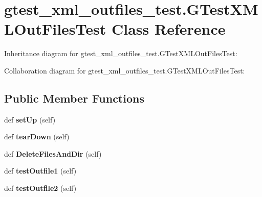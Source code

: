 \hypertarget{classgtest__xml__outfiles__test_1_1GTestXMLOutFilesTest}{}\section{gtest\+\_\+xml\+\_\+outfiles\+\_\+test.\+G\+Test\+X\+M\+L\+Out\+Files\+Test Class Reference}
\label{classgtest__xml__outfiles__test_1_1GTestXMLOutFilesTest}


Inheritance diagram for gtest\+\_\+xml\+\_\+outfiles\+\_\+test.\+G\+Test\+X\+M\+L\+Out\+Files\+Test\+:


Collaboration diagram for gtest\+\_\+xml\+\_\+outfiles\+\_\+test.\+G\+Test\+X\+M\+L\+Out\+Files\+Test\+:
\subsection*{Public Member Functions}
\begin{DoxyCompactItemize}
\item 
\mbox{\label{classgtest__xml__outfiles__test_1_1GTestXMLOutFilesTest_a56550f293277d18c36e868a637fe1153}} 
def {\bfseries set\+Up} (self)
\item 
\mbox{\label{classgtest__xml__outfiles__test_1_1GTestXMLOutFilesTest_a49d1d410370ba8a3cfcc281eaadb5706}} 
def {\bfseries tear\+Down} (self)
\item 
\mbox{\label{classgtest__xml__outfiles__test_1_1GTestXMLOutFilesTest_a503d2fbc9cd782ae57ac4307d2db43e1}} 
def {\bfseries Delete\+Files\+And\+Dir} (self)
\item 
\mbox{\label{classgtest__xml__outfiles__test_1_1GTestXMLOutFilesTest_a034738bbc00ac46d00f183402c561228}} 
def {\bfseries test\+Outfile1} (self)
\item 
\mbox{\label{classgtest__xml__outfiles__test_1_1GTestXMLOutFilesTest_a3c02687f092a482d0d0260c7ed94c618}} 
def {\bfseries test\+Outfile2} (self)
\end{DoxyCompactItemize}
